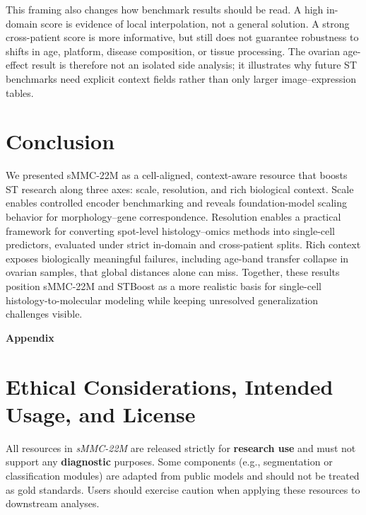 \documentclass{article}
\newcommand{\dataset}{sMMC-22M\xspace}
\newcommand{\methodname}{STBoost\xspace}
\begin{document}
This framing also changes how benchmark results should be read. A high in-domain score is evidence of local interpolation, not a general solution. A strong cross-patient score is more informative, but still does not guarantee robustness to shifts in age, platform, disease composition, or tissue processing. The ovarian age-effect result is therefore not an isolated side analysis; it illustrates why future ST benchmarks need explicit context fields rather than only larger image--expression tables.

\section{Conclusion}
We presented \dataset as a cell-aligned, context-aware resource that boosts ST research along three axes: scale, resolution, and rich biological context. Scale enables controlled encoder benchmarking and reveals foundation-model scaling behavior for morphology--gene correspondence. Resolution enables a practical framework for converting spot-level histology--omics methods into single-cell predictors, evaluated under strict in-domain and cross-patient splits. Rich context exposes biologically meaningful failures, including age-band transfer collapse in ovarian samples, that global distances alone can miss. Together, these results position \dataset and \methodname as a more realistic basis for single-cell histology-to-molecular modeling while keeping unresolved generalization challenges visible.

{\small


}





\clearpage
\appendix
\setcounter{section}{0}
\setcounter{subsection}{0}
\setcounter{table}{0}
\setcounter{figure}{0}
\renewcommand{\thesection}{\Alph{section}}
\renewcommand{\thesubsection}{\Alph{section}.\arabic{subsection}}
\renewcommand{\thetable}{S\arabic{table}}
\renewcommand{\thefigure}{S\arabic{figure}}

\thispagestyle{plain}
\begin{center}
\LARGE\bfseries Appendix
\end{center}
\suppressfloats[t]
\section{Ethical Considerations, Intended Usage, and License}
\label{sec:ethics}
\suppressfloats[t]
\noindent
All resources in \textit{\dataset} are released strictly for \textbf{research use} and must not support any \textbf{diagnostic} purposes. Some components (e.g., segmentation or classification modules) are adapted from public models and should not be treated as gold standards. Users should exercise caution when applying these resources to downstream analyses.
\end{document}
